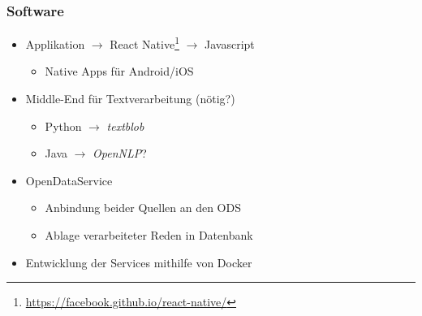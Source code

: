 \documentclass{beamer}
\begin{document}
    \begin{frame}
      \frametitle{Software}
      \begin{itemize}
        \item Applikation $\rightarrow$ React Native\footnote{\url{https://facebook.github.io/react-native/}} $\rightarrow$ Javascript
        \begin{itemize}
          \item Native Apps für Android/iOS
        \end{itemize}
        \item Middle-End für Textverarbeitung (nötig?) 
        \begin{itemize}
          \item Python $\rightarrow$ \textit{textblob}
          \item Java $\rightarrow$ \textit{OpenNLP}?
        \end{itemize}
        \item OpenDataService
        \begin{itemize}
          \item Anbindung beider Quellen an den ODS
          \item Ablage verarbeiteter Reden in Datenbank
        \end{itemize}
        \item Entwicklung der Services mithilfe von Docker
      \end{itemize}
    \end{frame}
  
\end{document}
